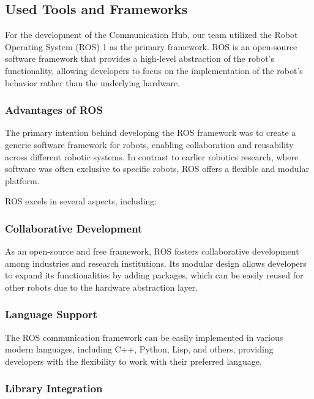 \subsection{Used Tools and Frameworks}
\label{subsec:used_tools_frameworks}

For the development of the Communication Hub, our team utilized the Robot Operating System (ROS) 1 as the primary framework. ROS is an open-source software framework that provides a high-level abstraction of the robot's functionality, allowing developers to focus on the implementation of the robot's behavior rather than the underlying hardware.


\subsubsection{Advantages of ROS}

The primary intention behind developing the ROS framework was to create a generic software framework for robots, enabling collaboration and reusability across different robotic systems. In contrast to earlier robotics research, where software was often exclusive to specific robots, ROS offers a flexible and modular platform.

ROS excels in several aspects, including:

\subsubsection{Collaborative Development}

As an open-source and free framework, ROS fosters collaborative development among industries and research institutions. Its modular design allows developers to expand its functionalities by adding packages, which can be easily reused for other robots due to the hardware abstraction layer.

\subsubsection{Language Support}

The ROS communication framework can be easily implemented in various modern languages, including C++, Python, Lisp, and others, providing developers with the flexibility to work with their preferred language.

\subsubsection{Library Integration}


